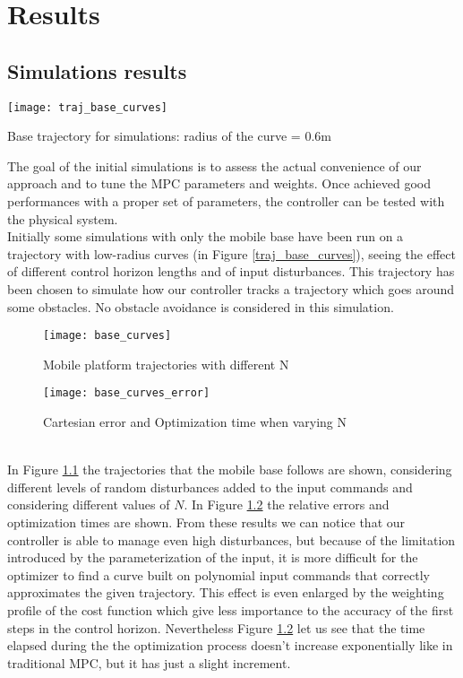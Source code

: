 
\chapter{Results}
\label{chapter7}
\section{Simulations results}
\begin{floatingfigure}[r]{.33\textwidth}
	\centering
	\texttt{[image: traj\_base\_curves]}
	\caption{Base trajectory for simulations: radius of the curve = 0.6m\label{traj_base_curves}}
\end{floatingfigure}
The goal of the initial simulations is to assess the actual convenience of our approach and to tune the MPC parameters and weights. Once achieved good performances with a proper set of parameters, the controller can be tested with the physical system.\\
Initially some simulations with only the mobile base have been run on a trajectory with low-radius curves (in Figure \ref{traj_base_curves}), seeing the effect of different control horizon lengths and of input disturbances. This trajectory has been chosen to simulate how our controller tracks a trajectory which goes around some obstacles. No obstacle avoidance is considered in this simulation.
\begin{figure}[!h]
	\centering
	\texttt{[image: base\_curves]}
	\caption{Mobile platform trajectories with different N}
	\label{base_curves}
\end{figure}
\begin{figure}[!h]
	\texttt{[image: base\_curves\_error]}
	\centering
	\caption{Cartesian error and Optimization time when varying N}
	\label{base_curves_errors}
\end{figure}
\\In Figure \ref{base_curves} the trajectories that the mobile base follows are shown, considering different levels of random disturbances added to the input commands and considering different values of $N$. In Figure \ref{base_curves_errors} the relative errors and optimization times are shown. From these results we can notice that our controller is able to manage even high disturbances, but because of the limitation introduced by the parameterization of the input, it is more difficult for the optimizer to find a curve built on polynomial input commands that correctly approximates the given trajectory. This effect is even enlarged by the weighting profile of the cost function which give less importance to the accuracy of the first steps in the control horizon. Nevertheless Figure \ref{base_curves_errors} let us see that the time elapsed during the the optimization process doesn't increase exponentially like in traditional MPC, but it has just a slight increment.\\
